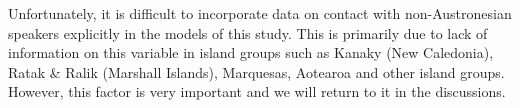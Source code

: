 \documentclass[a4paper,10pt]{article} %
\begin{document}
Unfortunately, it is difficult to incorporate data on contact with non-Austronesian speakers explicitly in the models of this study. This is primarily due to lack of information on this variable in island groups such as Kanaky (New Caledonia), Ratak \& Ralik (Marshall Islands), Marquesas, Aotearoa and other island groups. However, this factor is very important and we will return to it in the discussions.




\end{document}
